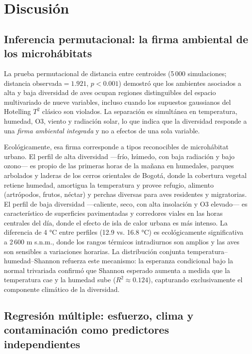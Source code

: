 \documentclass[9pt,letterpaper]{article}
\begin{document}
\section{Discusión}

\subsection{Inferencia permutacional: la firma ambiental de los microhábitats}

La prueba permutacional de distancia entre centroides (5\,000 simulaciones; distancia observada$=1.921$, $p<0.001$) demostró que los ambientes asociados a alta y baja diversidad de aves ocupan regiones distinguibles del espacio multivariado de nueve variables, incluso cuando los supuestos gaussianos del Hotelling $T^2$ clásico son violados. La separación es simultánea en temperatura, humedad, O3, viento y radiación solar, lo que indica que la diversidad responde a una \textit{firma ambiental integrada} y no a efectos de una sola variable.

Ecológicamente, esa firma corresponde a tipos reconocibles de microhábitat urbano. El perfil de alta diversidad ---frío, húmedo, con baja radiación y bajo ozono--- es propio de las primeras horas de la mañana en humedales, parques arbolados y laderas de los cerros orientales de Bogotá, donde la cobertura vegetal retiene humedad, amortigua la temperatura y provee refugio, alimento (artrópodos, frutos, néctar) y perchas diversas para aves residentes y migratorias. El perfil de baja diversidad ---caliente, seco, con alta insolación y O3 elevado--- es característico de superficies pavimentadas y corredores viales en las horas centrales del día, donde el efecto de isla de calor urbana es más intenso. La diferencia de 4 °C entre perfiles (12.9 vs. 16.8 °C) es ecológicamente significativa a 2\,600 m s.n.m., donde los rangos térmicos intradiurnos son amplios y las aves son sensibles a variaciones horarias. La distribución conjunta temperatura--humedad--Shannon refuerza este mecanismo: la esperanza condicional bajo la normal trivariada confirmó que Shannon esperado aumenta a medida que la temperatura cae y la humedad sube ($R^2\approx0.124$), capturando exclusivamente el componente climático de la diversidad.

\subsection{Regresión múltiple: esfuerzo, clima y contaminación como predictores independientes}
\end{document}
